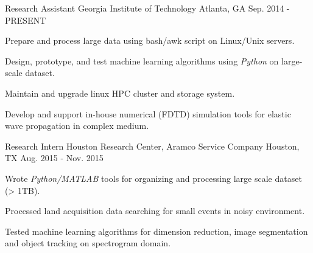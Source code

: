 

\begin{cventries}

  \cventry
    {Research Assistant} %
    {Georgia Institute of Technology} %
    {Atlanta, GA} %
    {Sep. 2014 - PRESENT} %
    {
      \begin{cvitems} %
        \item {Prepare and process large data using bash/awk script on Linux/Unix servers.}        
        \item {Design, prototype, and test machine learning algorithms using \textit{Python} on large-scale dataset.}
        \item {Maintain and upgrade linux HPC cluster and storage system.}
        \item {Develop and support in-house numerical (FDTD) simulation tools for elastic wave propagation in complex medium.}
      \end{cvitems}
    }

  \cventry
    {Research Intern} %
    {Houston Research Center, Aramco Service Company} %
    {Houston, TX} %
    {Aug. 2015 - Nov. 2015} %
    {
      \begin{cvitems} %
        \item {Wrote \textit{Python/MATLAB} tools for organizing and processing large scale dataset (> 1TB).}
        \item {Processed land acquisition data searching for small events in noisy environment.}
        \item {Tested machine learning algorithms for dimension reduction, image segmentation and object tracking on spectrogram domain.}
      \end{cvitems}
    }


\end{cventries}
